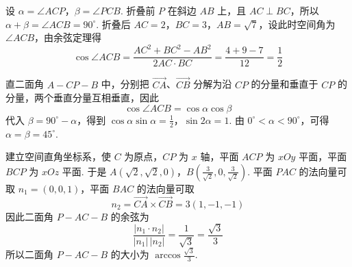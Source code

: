 \documentclass[UTF8,a4paper,oneside,11pt]{ctexbook}
\begin{document}
\begin{solution}
设 \(\alpha=\angle ACP\)，\(\beta=\angle PCB\). 折叠前 \(P\) 在斜边 \(AB\) 上，且 \(AC\perp BC\)，所以 \(\alpha+\beta=\angle ACB=90^\circ\). 折叠后 \(AC=2\)，\(BC=3\)，\(AB=\sqrt{7}\)，设此时空间角为 \(\angle ACB\)，由余弦定理得
\[
\cos\angle ACB=\frac{AC^2+BC^2-AB^2}{2AC\cdot BC}=\frac{4+9-7}{12}=\frac{1}{2}
\]

直二面角 \(A-CP-B\) 中，分别把 \(\overrightarrow{CA}\)、\(\overrightarrow{CB}\) 分解为沿 \(CP\) 的分量和垂直于 \(CP\) 的分量，两个垂直分量互相垂直，因此
\[
\cos\angle ACB=\cos\alpha\cos\beta
\]
代入 \(\beta=90^\circ-\alpha\)，得到
\(\cos\alpha\sin\alpha=\frac{1}{2}\)，\(\sin 2\alpha=1\).
由 \(0^\circ<\alpha<90^\circ\)，可得 \(\alpha=\beta=45^\circ\).

建立空间直角坐标系，使 \(C\) 为原点，\(CP\) 为 \(x\) 轴，平面 \(ACP\) 为 \(xOy\) 平面，平面 \(BCP\) 为 \(xOz\) 平面. 于是
\(A\left(\sqrt{2},\sqrt{2},0\right)\)，\(B\left(\frac{3}{\sqrt{2}},0,\frac{3}{\sqrt{2}}\right)\).
平面 \(PAC\) 的法向量可取 \(n_1=(0,0,1)\)，平面 \(BAC\) 的法向量可取
\[
n_2=\overrightarrow{CA}\times\overrightarrow{CB}=3(1,-1,-1)
\]
因此二面角 \(P-AC-B\) 的余弦为
\[
\frac{|n_1\cdot n_2|}{|n_1|\,|n_2|}=\frac{1}{\sqrt{3}}=\frac{\sqrt{3}}{3}
\]
所以二面角 \(P-AC-B\) 的大小为 \(\arccos\frac{\sqrt{3}}{3}\).
\end{solution}

\end{document}

